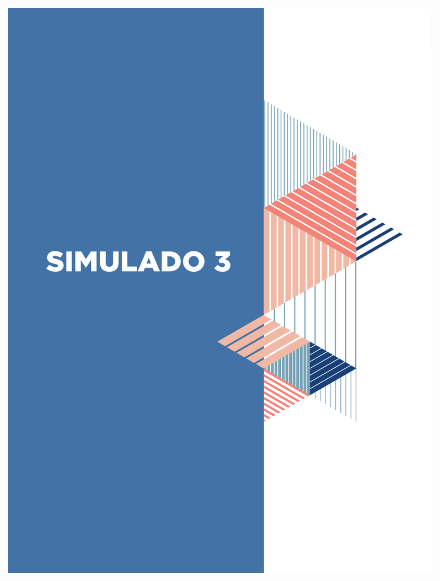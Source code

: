 \begin{figure}[htpb!]
\vspace*{-3cm}
\hspace*{-2.5cm}\includegraphics[scale=1]{../watermarks/3simulado9ano.pdf}
\end{figure}



